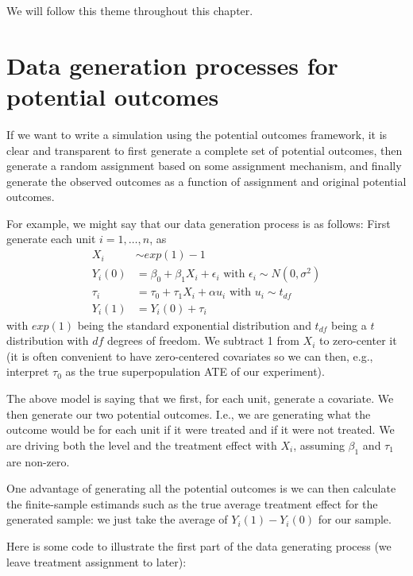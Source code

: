 \documentclass[
]{book}
\begin{document}
We will follow this theme throughout this chapter.

\section{Data generation processes for potential outcomes}\label{data-generation-processes-for-potential-outcomes}

If we want to write a simulation using the potential outcomes framework, it is clear and transparent to first generate a complete set of potential outcomes, then generate a random assignment based on some assignment mechanism, and finally generate the observed outcomes as a function of assignment and original potential outcomes.

For example, we might say that our data generation process is as follows: First generate each unit \(i = 1, \ldots, n\), as
\[
\begin{aligned}
X_i &\sim exp( 1 ) - 1 \\
Y_i(0) &= \beta_0 + \beta_1 X_i + \epsilon_i \mbox{ with } \epsilon_i \sim N( 0, \sigma^2 ) \\
\tau_i &= \tau_0 + \tau_1 X_i + \alpha u_i \mbox{ with } u_i \sim t_{df} \\
Y_i(1) &= Y_i(0) + \tau_i 
\end{aligned}
\]
with \(exp(1)\) being the standard exponential distribution and \(t_{df}\) being a \(t\) distribution with \(df\) degrees of freedom.
We subtract 1 from \(X_i\) to zero-center it (it is often convenient to have zero-centered covariates so we can then, e.g., interpret \(\tau_0\) as the true superpopulation ATE of our experiment).

The above model is saying that we first, for each unit, generate a covariate.
We then generate our two potential outcomes.
I.e., we are generating what the outcome would be for each unit if it were treated and if it were not treated.
We are driving both the level and the treatment effect with \(X_i\), assuming \(\beta_1\) and \(\tau_1\) are non-zero.

One advantage of generating all the potential outcomes is we can then calculate the finite-sample estimands such as the true average treatment effect for the generated sample: we just take the average of \(Y_i(1) - Y_i(0)\) for our sample.

Here is some code to illustrate the first part of the data generating process (we leave treatment assignment to later):
\end{document}
